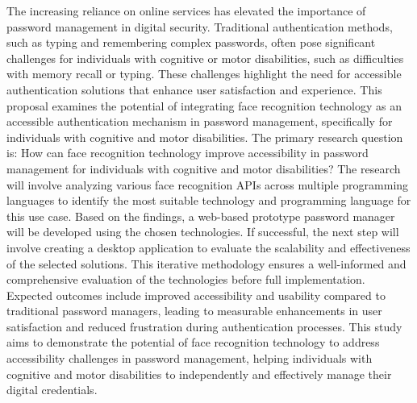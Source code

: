 The increasing reliance on online services has elevated the importance of password management in digital security. Traditional authentication methods, such as typing and remembering complex passwords, often pose significant challenges for individuals with cognitive or motor disabilities, such as difficulties with memory recall or typing. These challenges highlight the need for accessible authentication solutions that enhance user satisfaction and experience. This proposal examines the potential of integrating face recognition technology as an accessible authentication mechanism in password management, specifically for individuals with cognitive and motor disabilities.
The primary research question is: How can face recognition technology improve accessibility in password management for individuals with cognitive and motor disabilities? The research will involve analyzing various face recognition APIs across multiple programming languages to identify the most suitable technology and programming language for this use case. Based on the findings, a web-based prototype password manager will be developed using the chosen technologies. If successful, the next step will involve creating a desktop application to evaluate the scalability and effectiveness of the selected solutions. This iterative methodology ensures a well-informed and comprehensive evaluation of the technologies before full implementation.
Expected outcomes include improved accessibility and usability compared to traditional password managers, leading to measurable enhancements in user satisfaction and reduced frustration during authentication processes. This study aims to demonstrate the potential of face recognition technology to address accessibility challenges in password management, helping individuals with cognitive and motor disabilities to independently and effectively manage their digital credentials.

